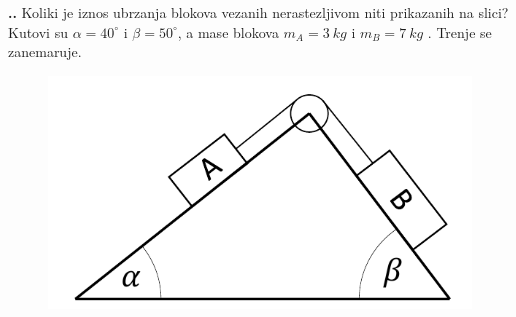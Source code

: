 
\noindent 
\textbf{
\thecjelina.\thezadatak.}
Koliki je iznos ubrzanja blokova vezanih nerastezljivom niti prikazanih na slici? Kutovi su 
$\alpha=40^\circ $  i $\beta=50^\circ $, a mase blokova $m_A=3\ kg$ i $m_B=7\ kg$ . Trenje se zanemaruje.

\begin{figure}[ht]%
  \begin{center}
    \includegraphics[scale=0.25]{../03_Dinamika_materijalne_tocke/Zadatak_D707.png}
  \end{center}
\end{figure}

